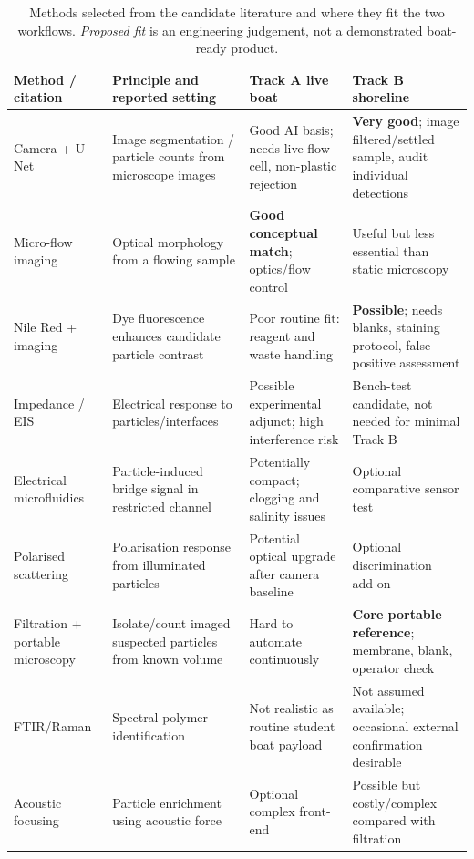 \documentclass[10pt,a4paper]{article}
\begin{document}
\begin{table}[H]\centering\footnotesize
\caption{Methods selected from the candidate literature and where they fit the two workflows. \emph{Proposed fit} is an engineering judgement, not a demonstrated boat-ready product.}\label{tab:methods}
\begin{tabularx}{\linewidth}{@{}L{2.6cm}L{3.0cm}YY@{}}\toprule
{}\textbf{Method / citation} & \textbf{Principle and reported setting} & \textbf{Track A live boat} & \textbf{Track B shoreline} \\\midrule
Camera + U-Net \cite{Lee2022,UrbanCNN2024} & Image segmentation / particle counts from microscope images & Good AI basis; needs live flow cell, non-plastic rejection & \textbf{Very good}; image filtered/settled sample, audit individual detections \\
Micro-flow imaging \cite{Microflow2023} & Optical morphology from a flowing sample & \textbf{Good conceptual match}; optics/flow control & Useful but less essential than static microscopy \\
Nile Red + imaging \cite{ErniCassola2017,Minor2023} & Dye fluorescence enhances candidate particle contrast & Poor routine fit: reagent and waste handling & \textbf{Possible}; needs blanks, staining protocol, false-positive assessment \\
Impedance / EIS \cite{Blevins2021,Kim2024} & Electrical response to particles/interfaces & Possible experimental adjunct; high interference risk & Bench-test candidate, not needed for minimal Track B \\
Electrical microfluidics \cite{Warraich2025} & Particle-induced bridge signal in restricted channel & Potentially compact; clogging and salinity issues & Optional comparative sensor test \\
Polarised scattering \cite{Polarized2021} & Polarisation response from illuminated particles & Potential optical upgrade after camera baseline & Optional discrimination add-on \\
Filtration + portable microscopy \cite{Ermolin2024,MPWE00012} & Isolate/count imaged suspected particles from known volume & Hard to automate continuously & \textbf{Core portable reference}; membrane, blank, operator check \\
FTIR/Raman \cite{Sefiloglu2024,MPWE00012} & Spectral polymer identification & Not realistic as routine student boat payload & Not assumed available; occasional external confirmation desirable \\
Acoustic focusing \cite{Ohori2025} & Particle enrichment using acoustic force & Optional complex front-end & Possible but costly/complex compared with filtration \\
\bottomrule\end{tabularx}
\end{table}
\end{document}
